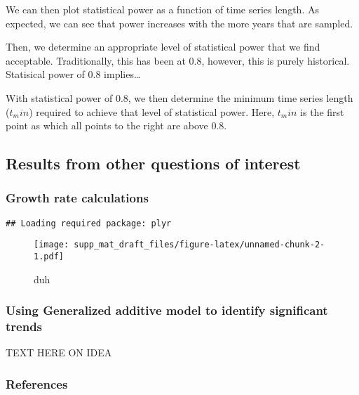 \documentclass[12pt,]{article}
\begin{document}
We can then plot statistical power as a function of time series length.
As expected, we can see that power increases with the more years that
are sampled.

Then, we determine an appropriate level of statistical power that we
find acceptable. Traditionally, this has been at 0.8, however, this is
purely historical. Statisical power of 0.8 implies\ldots{}

With statistical power of 0.8, we then determine the minimum time series
length (\(t_min\)) required to achieve that level of statistical power.
Here, \(t_min\) is the first point as which all points to the right are
above 0.8.

\subsection{Results from other questions of
interest}\label{results-from-other-questions-of-interest}

\subsubsection{Growth rate calculations}\label{growth-rate-calculations}

\begin{verbatim}
## Loading required package: plyr
\end{verbatim}

\begin{figure}[htbp]
\centering
\texttt{[image: supp\_mat\_draft\_files/figure-latex/unnamed-chunk-2-1.pdf]}
\caption{duh\label{fig:growth_rate}}
\end{figure}

\subsubsection{Using Generalized additive model to identify significant
trends}\label{using-generalized-additive-model-to-identify-significant-trends}

TEXT HERE ON IDEA

\subsubsection{References}\label{references}


\end{document}

